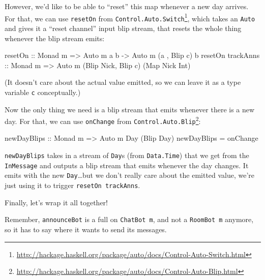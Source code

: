 \documentclass[]{article}
\newenvironment{Shaded}{}{}
\newcommand{\DataTypeTok}[1]{\textcolor[rgb]{0.56,0.13,0.00}{{#1}}}
\newcommand{\OtherTok}[1]{\textcolor[rgb]{0.00,0.44,0.13}{{#1}}}
\newcommand{\FunctionTok}[1]{\textcolor[rgb]{0.02,0.16,0.49}{{#1}}}
\newcommand{\NormalTok}[1]{{#1}}
\renewcommand{\href}[2]{#2\footnote{\url{#1}}}
\begin{document}
However, we'd like to be able to ``reset'' this map whenever a new day arrives.
For that, we can use \texttt{resetOn} from
\href{http://hackage.haskell.org/package/auto/docs/Control-Auto-Switch.html}{\texttt{Control.Auto.Switch}},
which takes an \texttt{Auto} and gives it a ``reset channel'' input blip stream,
that resets the whole thing whenever the blip stream emits:

\begin{Shaded}
\begin{Highlighting}[]
\OtherTok{resetOn ::} \DataTypeTok{Monad} \NormalTok{m }\OtherTok{=>} \DataTypeTok{Auto} \NormalTok{m a b }\OtherTok{->} \DataTypeTok{Auto} \NormalTok{m (a        , }\DataTypeTok{Blip} \NormalTok{c) b}
\NormalTok{resetOn}\OtherTok{ trackAnns ::} \DataTypeTok{Monad} \NormalTok{m }\OtherTok{=>}     \DataTypeTok{Auto} \NormalTok{m (}\DataTypeTok{Blip} \DataTypeTok{Nick}\NormalTok{, }\DataTypeTok{Blip} \NormalTok{c) (}\DataTypeTok{Map} \DataTypeTok{Nick} \DataTypeTok{Int}\NormalTok{)}
\end{Highlighting}
\end{Shaded}

(It doesn't care about the actual value emitted, so we can leave it as a type
variable \texttt{c} conceptually.)

Now the only thing we need is a blip stream that emits whenever there is a new
day. For that, we can use \texttt{onChange} from
\href{http://hackage.haskell.org/package/auto/docs/Control-Auto-Blip.html}{\texttt{Control.Auto.Blip}}:

\begin{Shaded}
\begin{Highlighting}[]
\OtherTok{newDayBlips ::} \DataTypeTok{Monad} \NormalTok{m }\OtherTok{=>} \DataTypeTok{Auto} \NormalTok{m }\DataTypeTok{Day} \NormalTok{(}\DataTypeTok{Blip} \DataTypeTok{Day}\NormalTok{)}
\NormalTok{newDayBlips }\FunctionTok{=} \NormalTok{onChange}
\end{Highlighting}
\end{Shaded}

\texttt{newDayBlips} takes in a stream of \texttt{Day}s (from
\texttt{Data.Time}) that we get from the \texttt{InMessage} and outputs a blip
stream that emits whenever the day changes. It emits with the new
\texttt{Day}\ldots{}but we don't really care about the emitted value, we're just
using it to trigger \texttt{resetOn\ trackAnns}.

Finally, let's wrap it all together!

Remember, \texttt{announceBot} is a full on \texttt{ChatBot\ m}, and not a
\texttt{RoomBot\ m} anymore, so it has to say where it wants to send its
messages.
\end{document}
